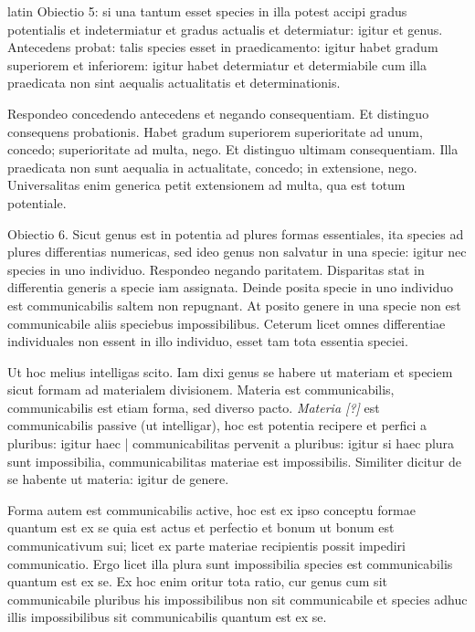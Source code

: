 \begin{otherlanguage*}{latin}
\pstart
 Obiectio 5: si una tantum esset species in illa potest accipi gradus potentialis et indetermiatur et gradus actualis et determiatur: igitur et genus. Antecedens probat: talis species esset in praedicamento: igitur habet gradum superiorem et inferiorem: igitur habet determiatur et determiabile cum illa praedicata non sint aequalis actualitatis et determinationis. 
\pend

\pstart
 Respondeo concedendo antecedens et negando consequentiam. Et distinguo consequens probationis. Habet gradum superiorem superioritate ad unum, concedo; superioritate ad multa, nego. Et distinguo ultimam consequentiam. Illa praedicata non sunt aequalia in actualitate, concedo; in extensione, nego. Universalitas enim generica petit extensionem ad multa, qua est totum potentiale. 
\pend

\pstart
 Obiectio 6. Sicut genus est in potentia ad plures formas essentiales, ita species ad plures differentias numericas, sed ideo genus non salvatur in una specie: igitur nec species in uno individuo. Respondeo negando paritatem. Disparitas stat in differentia generis a specie iam assignata. Deinde posita specie in uno individuo est communicabilis saltem non repugnant. At posito genere in una specie non est communicabile aliis speciebus impossibilibus. Ceterum licet omnes differentiae individuales non essent in illo individuo, esset tam tota essentia speciei. 
\pend

\pstart
 Ut hoc melius intelligas scito. Iam dixi genus se habere ut materiam et speciem sicut formam ad materialem divisionem. Materia est communicabilis, communicabilis est etiam forma, sed diverso pacto. \emph{Materia [?]} est communicabilis passive (ut intelligar), hoc est potentia recipere et perfici a pluribus: igitur haec \textnormal{|} communicabilitas pervenit a pluribus: igitur si haec plura sunt impossibilia, communicabilitas materiae est impossibilis. Similiter dicitur de se habente ut materia: igitur de genere. 
\pend

\pstart
 Forma autem est communicabilis active, hoc est ex ipso conceptu formae quantum est ex se quia est actus et perfectio et bonum ut bonum est communicativum sui; licet ex parte materiae recipientis possit impediri communicatio. Ergo licet illa plura sunt impossibilia species est communicabilis quantum est ex se. Ex hoc enim oritur tota ratio, cur genus cum sit communicabile pluribus his impossibilibus non sit communicabile et species adhuc illis impossibilibus sit communicabilis quantum est ex se. 
\pend


\end{otherlanguage*}
